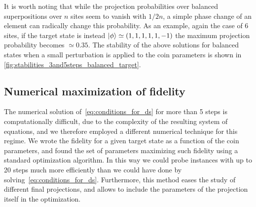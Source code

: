 It is worth noting that while the projection probabilities over balanced superpositions over $n$ sites seem to vanish with $1/2n$, a simple phase change of an element can radically change this probability.
As an example, again the case of 6 sites, if the target state is instead $\ket\phi \simeq (1,1,1,1,1,-1)$ the maximum projection probability becomes $\simeq 0.35$.
The stability of the above solutions for balanced states when a small perturbation is applied to the coin parameters is shown in \cref{fig:stabilities_3and5steps_balanced_target}.

\subsection{Numerical maximization of  fidelity}
\label{sec:numerical_fid_max}
The numerical solution of~\cref{eq:conditions_for_ds} for more than 5 steps is computationally difficult, due to the complexity of the resulting system of equations,
and we therefore employed a different numerical technique for this regime.
We wrote the fidelity for a given target state as a function of the coin parameters, and found the set of parameters maximizing such fidelity using a standard optimization algorithm.
In this way we could probe instances with up to 20 steps much more efficiently than we could have done by solving~\cref{eq:conditions_for_ds}.
Furthermore, this method eases the study of different final projections, and allows to include the parameters of the projection itself in the optimization.

